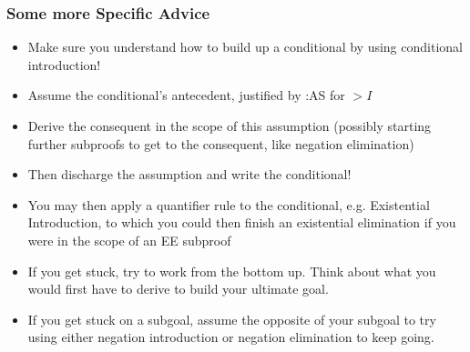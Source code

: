 \begin{frame}
\frametitle{Some more Specific Advice}

\begin{itemize}[<+->]

\item Make sure you understand how to build up a conditional by using conditional introduction! 
\bi
\item Assume the conditional's antecedent, justified by :AS for $>I$

\item Derive the consequent in the scope of this assumption (possibly starting further subproofs to get to the consequent, like negation elimination)

\item Then discharge the assumption and write the conditional!
\ei

\item You may then apply a quantifier rule to the conditional, e.g. Existential Introduction, to which you could then finish an existential elimination if you were in the scope of an EE subproof

\item If you get stuck, try to work from the bottom up. Think about what you would first have to derive to build your ultimate goal.

\item If you get stuck on a subgoal, assume the opposite of your subgoal to try using either negation introduction or negation elimination to keep going.

\end{itemize}
\end{frame}










